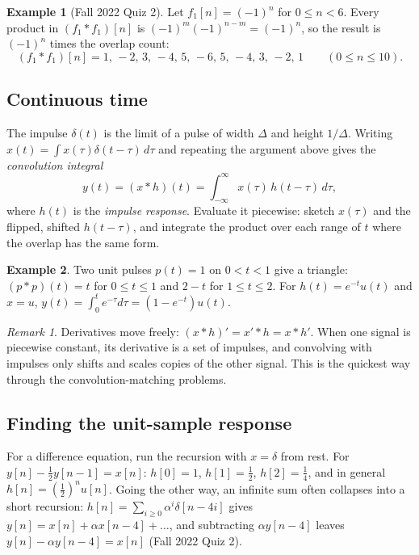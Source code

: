 \documentclass[11pt]{article}
\numberwithin{equation}{section}
\theoremstyle{definition}
\newtheorem{example}{Example}[section]
\theoremstyle{remark}
\newtheorem*{remark}{Remark}
\begin{document}
\begin{example}[Fall 2022 Quiz 2]
Let $f_1[n]=(-1)^n$ for $0\le n<6$. Every product in $(f_1*f_1)[n]$ is
$(-1)^m(-1)^{n-m}=(-1)^n$, so the result is $(-1)^n$ times the overlap count:
\[
(f_1*f_1)[n]=1,\,-2,\,3,\,-4,\,5,\,-6,\,5,\,-4,\,3,\,-2,\,1\qquad(0\le n\le10).
\]
\end{example}

\subsection{Continuous time}
The impulse $\delta(t)$ is the limit of a pulse of width $\Delta$ and height $1/\Delta$. Writing
$x(t)=\int x(\tau)\delta(t-\tau)\,d\tau$ and repeating the argument above gives the
\emph{convolution integral}
\begin{equation}
y(t)=(x*h)(t)=\int_{-\infty}^{\infty}x(\tau)\,h(t-\tau)\,d\tau,
\end{equation}
where $h(t)$ is the \emph{impulse response}. Evaluate it piecewise: sketch $x(\tau)$ and the
flipped, shifted $h(t-\tau)$, and integrate the product over each range of $t$ where the overlap
has the same form.

\begin{example}
Two unit pulses $p(t)=1$ on $0<t<1$ give a triangle: $(p*p)(t)=t$ for $0\le t\le1$ and $2-t$
for $1\le t\le2$. For $h(t)=e^{-t}u(t)$ and $x=u$,
$y(t)=\int_0^t e^{-\tau}d\tau=(1-e^{-t})u(t)$.
\end{example}

\begin{remark}
Derivatives move freely: $(x*h)'=x'*h=x*h'$. When one signal is piecewise constant, its
derivative is a set of impulses, and convolving with impulses only shifts and scales copies of
the other signal. This is the quickest way through the convolution-matching problems.
\end{remark}

\subsection{Finding the unit-sample response}
For a difference equation, run the recursion with $x=\delta$ from rest. For
$y[n]-\frac12y[n-1]=x[n]$: $h[0]=1$, $h[1]=\frac12$, $h[2]=\frac14$, and in general
$h[n]=\left(\frac12\right)^nu[n]$. Going the other way, an infinite sum often collapses into a short
recursion: $h[n]=\sum_{i\ge0}\alpha^i\delta[n-4i]$ gives $y[n]=x[n]+\alpha x[n-4]+\dots$, and
subtracting $\alpha y[n-4]$ leaves $y[n]-\alpha y[n-4]=x[n]$ (Fall 2022 Quiz 2).
\end{document}
